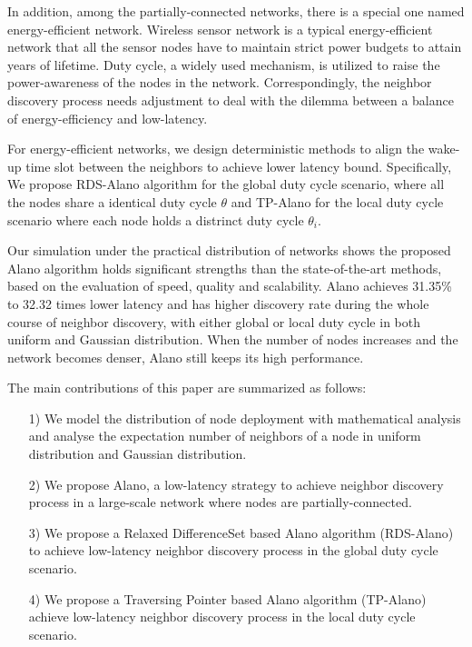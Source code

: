In addition, among the partially-connected networks, there is a special 
one named energy-efficient network.
Wireless sensor network is a typical energy-efficient network that all the sensor nodes have to maintain 
strict power budgets to attain years of lifetime\cite{dunkels2011contikimac}.
Duty cycle, a widely used mechanism, is utilized to raise the power-awareness of the nodes in the network.
Correspondingly, the neighbor discovery process needs adjustment to deal with the dilemma between 
a balance of energy-efficiency and low-latency.


For energy-efficient networks, we design deterministic methods
to align the wake-up time slot between the neighbors to achieve lower latency bound.
Specifically, We propose RDS-Alano algorithm for the global duty cycle scenario, where 
all the nodes share a identical duty cycle $\theta$ and TP-Alano for the
local duty cycle scenario where each node holds a distrinct duty cycle $\theta_i$. 


Our simulation under the practical distribution of networks 
\cite{wang2013gaussian} shows the proposed Alano algorithm
holds significant strengths than the state-of-the-art methods,
based on the evaluation of speed, quality and scalability.
Alano achieves 31.35\% to 32.32 times lower latency
and has higher discovery rate during the whole course of neighbor discovery, 
with either global or local duty cycle in both uniform and Gaussian distribution.
When the number of nodes increases and the network becomes denser, 
Alano still keeps its high performance. 


The main contributions of this paper are summarized as follows:
\begin{itemize}
\item[1)] We model the distribution of node deployment with mathematical analysis 
and analyse the expectation number of neighbors of a node in uniform distribution and Gaussian
distribution.
\item[2)] We propose Alano, a low-latency strategy to achieve neighbor discovery process
in a large-scale network where nodes are partially-connected.
\item[3)] We propose a Relaxed DifferenceSet based Alano algorithm (RDS-Alano) 
to achieve low-latency neighbor discovery process in the global duty cycle scenario. 
\item[4)] We propose a Traversing Pointer based Alano algorithm (TP-Alano) 
achieve low-latency neighbor discovery process in the local duty cycle scenario. 
\end{itemize}



